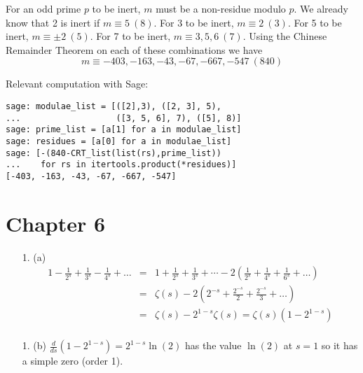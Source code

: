\documentclass{article}
\newcommand{\modequiv}[3]{#1 \equiv #2\ (#3)}
\begin{document}
\begin{enumerate}
    For an odd prime $p$ to be inert, $m$ must be a non-residue modulo $p$.  We already know that 2 is inert if $\modequiv{m}{5}{8}$.  For 3 to be inert, $\modequiv{m}{2}{3}$.  For 5 to be inert, $\modequiv{m}{\pm 2}{5}$.  For 7 to be inert, $\modequiv{m}{3, 5, 6}{7}$.  Using the Chinese Remainder Theorem on each of these combinations we have \[ \modequiv{m}{-403, -163, -43, -67, -667, -547}{840} \]

    Relevant computation with Sage:
\begin{verbatim}
sage: modulae_list = [([2],3), ([2, 3], 5),
...                   ([3, 5, 6], 7), ([5], 8)]
sage: prime_list = [a[1] for a in modulae_list]
sage: residues = [a[0] for a in modulae_list]
sage: [-(840-CRT_list(list(rs),prime_list))
...    for rs in itertools.product(*residues)]
[-403, -163, -43, -67, -667, -547]
\end{verbatim}

\end{enumerate}

\section*{Chapter 6}

\begin{enumerate}
    \item [1. (a)]
    \begin{eqnarray*}
        1 - \frac{1}{2^s} + \frac{1}{3^s} - \frac{1}{4^s} + \ldots &=& 1 + \frac{1}{2^s} + \frac{1}{3^s} + \cdots - 2 \left( \frac{1}{2^s} + \frac{1}{4^s} + \frac{1}{6^s} + \ldots \right) \\
        &=& \zeta(s) - 2\left(2^{-s} + \frac{2^{-s}}{2} + \frac{2^{-s}}{3} + \ldots \right) \\
        &=& \zeta(s) - 2^{1-s}\zeta(s) = \zeta(s) (1 - 2^{1-s}) \\
    \end{eqnarray*}
    \item [1. (b)]
        $\frac{d}{ds} (1 - 2^{1-s}) = 2^{1-s} \ln (2)$ has the value $\ln(2)$ at $s = 1$ so it has a simple zero (order 1).
\end{enumerate}
\end{document}
